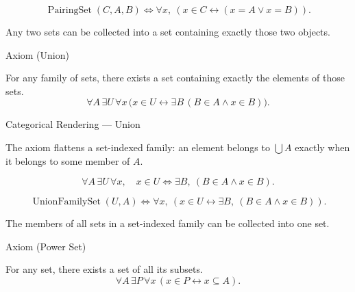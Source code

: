 \begin{remark*}
\[
  \operatorname{PairingSet}(C,A,B)
  \iff
  \forall x,\ (x\in C\leftrightarrow (x=A\vee x=B)).
\]
\end{remark*}

\begin{remark*}[Interpretation]
Any two sets can be collected into a set containing exactly those two objects.
\end{remark*}

\NoLocalDependencies

\begin{axiombox}{Axiom (Union)}
\begin{axiom}
\label{ax:union}
For any family of sets, there exists a set containing exactly the elements of
those sets.
\[
\forall A \, \exists U \,
\forall x \,
\bigl( x \in U \leftrightarrow \exists B \, (B \in A \land x \in B) \bigr).
\]
\end{axiom}
\end{axiombox}

\begin{lracategoricalcard}{Categorical Rendering --- Union}
\begin{center}

\end{center}
\smallskip
\noindent\footnotesize
The axiom flattens a set-indexed family: an element belongs to \(\bigcup A\)
exactly when it belongs to some member of \(A\).
\end{lracategoricalcard}

\begin{remark*}
\[
  \forall A\,\exists U\,\forall x,\quad
  x\in U \iff \exists B,\ (B\in A\wedge x\in B).
\]
\end{remark*}

\begin{remark*}
\[
  \operatorname{UnionFamilySet}(U,A)
  \iff
  \forall x,\ (x\in U\leftrightarrow \exists B,\ (B\in A\wedge x\in B)).
\]
\end{remark*}

\begin{remark*}[Interpretation]
The members of all sets in a set-indexed family can be collected into one set.
\end{remark*}

\NoLocalDependencies

\begin{axiombox}{Axiom (Power Set)}
\begin{axiom}
\label{ax:power-set}
For any set, there exists a set of all its subsets.
\[
\forall A \, \exists P \,
\forall x \, (x \in P \leftrightarrow x \subseteq A).
\]
\end{axiom}
\end{axiombox}


